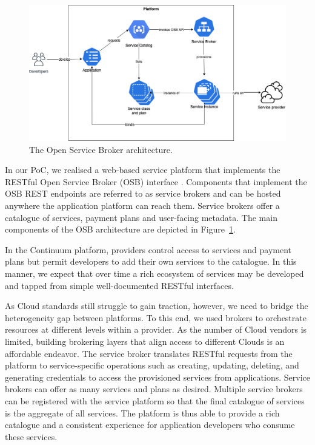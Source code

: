 \begin{figure}[ht]
\centering
\includegraphics[width=\columnwidth]{figures/osb}
\caption{The Open Service Broker architecture.} \label{fig:osb}
\end{figure}

In our PoC, we realised a web-based service platform that implements the RESTful Open Service Broker (OSB) interface \cite{osb}. Components that implement the OSB REST endpoints are referred to as service brokers and can be hosted anywhere the application platform can reach them. Service brokers offer a catalogue of services, payment plans and user-facing metadata. The main components of the OSB architecture are depicted in Figure~\ref{fig:osb}.

In the Continuum platform, providers control access to services and payment plans but permit developers to add their own services to the catalogue. In this manner, we expect that over time a rich ecosystem of services may be developed and tapped from simple well-documented RESTful interfaces.

As Cloud standards still struggle to gain traction, however, we need to bridge the heterogeneity gap between platforms. 
To this end, we used brokers to orchestrate resources at different levels within a provider. As the number of Cloud vendors is limited, building brokering layers that align access to different Clouds is an affordable endeavor. The service broker translates RESTful requests from the platform to service-specific operations such as creating, updating, deleting, and generating credentials to access the provisioned services from applications. Service brokers can offer as many services and plans as desired. Multiple service brokers can be registered with the service platform so that the final catalogue of services is the aggregate of all services. The platform is thus able to provide a rich catalogue and a consistent experience for application developers who consume these services.

